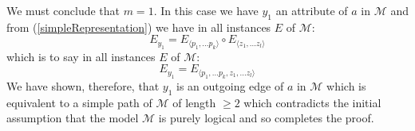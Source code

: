 \documentclass[10pt,a4paper]{article}
\newcommand{\genericmodel}{\mathcal{M}}
\begin{document}
We must conclude that $m=1$.
In this case we have $y_1$ an attribute of $a$ in $\genericmodel$ and from (\ref{simpleRepresentation})  we have in all instances $E$ of $\genericmodel$:
\begin{equation}
E_{y_1}=E_{\langle p_1,...p_k \rangle} \circ E_{\langle z_1,...z_l \rangle}
\end{equation}
\noindent which is to say in all instances $E$ of $\genericmodel$:
\begin{equation}
E_{y_1}=E_{\langle p_1,...p_k ,z_1,...z_l \rangle}
\end{equation}
\noindent
We have shown, therefore, that $y_1$ is an outgoing edge of $a$ in $\genericmodel$ 
which is equivalent to a simple path of $\genericmodel$ of length $\geq 2$ which contradicts  the 
 initial assumption that the model $\genericmodel$ is purely logical and so completes the proof.
\end{document}
